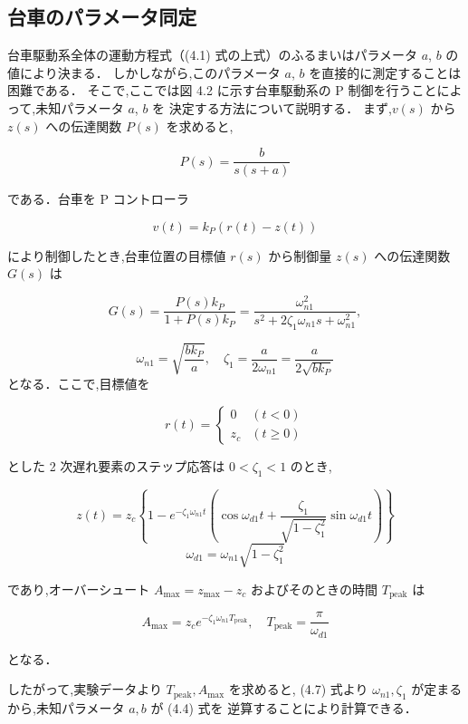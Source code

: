 \subsection{台車のパラメータ同定}

台車駆動系全体の運動方程式（(4.1) 式の上式）のふるまいはパラメータ \(a\), \(b\) の値により決まる．
しかしながら,このパラメータ \(a\), \(b\) を直接的に測定することは困難である．
そこで,ここでは図 4.2 に示す台車駆動系の P 制御を行うことによって,未知パラメータ \(a\), \(b\) を
決定する方法について説明する．
まず,\( v(s) \) から \( z(s) \) への伝達関数 \( P(s) \) を求めると,

\[
  P(s) = \frac{b}{s(s + a)} \tag{4.2}
\]

である．台車を P コントローラ

\[
  v(t) = k_P \left( r(t) - z(t) \right) \tag{4.3}
\]

により制御したとき,台車位置の目標値 \( r(s) \) から制御量 \( z(s) \) への伝達関数 \( G(s) \) は

\[
  G(s) = \frac{P(s)k_P}{1 + P(s)k_P} = \frac{\omega_{n1}^2}{s^2 + 2\zeta_1 \omega_{n1} s + \omega_{n1}^2}, \tag{4.4}
\]

\[
  \omega_{n1} = \sqrt{\frac{b k_P}{a}}, \quad \zeta_1 = \frac{a}{2\omega_{n1}} = \frac{a}{2\sqrt{b k_P}}
\]
となる．ここで,目標値を

\[
  r(t) = 
  \begin{cases}
    0   & (t < 0)    \\
    z_c & (t \geq 0)
  \end{cases} \tag{4.5}
\]

とした 2 次遅れ要素のステップ応答は \(0 < \zeta_1 < 1\) のとき,

\[
  z(t) = z_c \left\{ 1 - e^{-\zeta_1 \omega_{n1} t}
  \left( \cos \omega_{d1} t + \frac{\zeta_1}{\sqrt{1 - \zeta_1^2}} \sin \omega_{d1} t \right) \right\} \tag{4.6}
\]
\[
  \omega_{d1} = \omega_{n1} \sqrt{1 - \zeta_1^2}
\]

であり,オーバーシュート \( A_{\text{max}} = z_{\text{max}} - z_c \) およびそのときの時間 \( T_{\text{peak}} \) は

\[
  A_{\text{max}} = z_c e^{-\zeta_1 \omega_{n1} T_{\text{peak}}}, \quad T_{\text{peak}} = \frac{\pi}{\omega_{d1}} \tag{4.7}
\]

となる．

したがって,実験データより \( T_{\text{peak}}, A_{\text{max}} \) を求めると,
(4.7) 式より \( \omega_{n1}, \zeta_1 \) が定まるから,未知パラメータ \( a, b \) が (4.4) 式を
逆算することにより計算できる．

